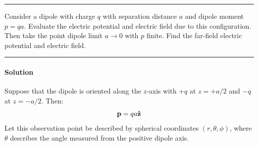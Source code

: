 		\vspace{1em}\hrule\vspace{0.6em}
			Consider a dipole with charge $q$ with separation distance $a$ and dipole moment $p=qa$. Evaluate the electric
			potential and electric field due to this configuration. Then take the point dipole limit $a\to0$ with $p$ finite.
			Find the far-field electric potential and electric field.
		\vspace{1em}\hrule\vspace{1em}

		\paragraph{Solution} Suppose that the dipole is oriented along the $z$-axis with $+q$ at $z=+a/2$ and $-q$ at $z=-a/2$.
		Then:
		\begin{equation}
			\vb{p} = qa\vu{z}
		\end{equation}
		Let this observation point be described by spherical coordinates $(r,\theta,\phi)$, where $\theta$ describes the angle
		measured from the positive dipole axis.

